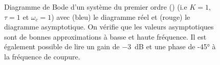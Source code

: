 \afterpage{\clearpage}
\begin{figure}[!t]
\centering
{}



\caption{Diagramme de Bode d'un système du premier ordre 
         () (i.e $K=1$, $\tau=1$ et $\omega_c=1$) avec 
         (bleu) le diagramme réel et (rouge) le diagramme asymptotique. On 
         vérifie que les valeurs asymptotiques sont de bonnes approximations 
         à basse et haute fréquence. Il est également possible de lire un 
         gain de \SI{-3}{\dB} et une phase de -45\si{\degree} à la fréquence 
         de coupure.\label{fig-bode_1er_3}}
\end{figure}
